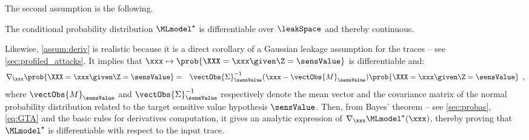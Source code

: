 The second assumption is the following.
\begin{assum}[Regularity]\label{assum:deriv}
	The conditional probability distribution \(\MLmodel^\star\) is differentiable over \(\leakSpace\) and thereby continuous.
\end{assum}
Likewise, \autoref{assum:deriv} is realistic because it is a direct corollary of a Gaussian leakage assumption for the traces -- see \autoref{sec:profiled_attacks}.
It implies that \(\xxx \mapsto \prob{\XXX = \xxx \given \Z = \sensValue}\) is differentiable and:
\begin{eqnarray}\label{eq:GTA}
	\nabla_{\xxx} \prob{\XXX = \xxx \given \Z = \sensValue} & = & 
	\vectObs{\Sigma}_{\sensValue}^{-1} (\xxx - \vectObs{M}_{\sensValue}) \prob{\XXX = \xxx \given 
	\Z = \sensValue} \enspace ,
\end{eqnarray}
where \(\vectObs{M}_{\sensValue}\) and \(\vectObs{\Sigma}_{\sensValue}^{-1}\) respectively denote the mean vector and the covariance matrix of the normal probability distribution related to the target sensitive value hypothesis \(\sensValue\).
Then, from Bayes' theorem -- see \autoref{sec:probas}, \autoref{eq:GTA} and the basic rules for derivatives computation, it gives an analytic expression of \(\nabla_{\xxx}\MLmodel^\star(\xxx)\), thereby proving that \(\MLmodel^\star\) is differentiable with respect to the input trace.


